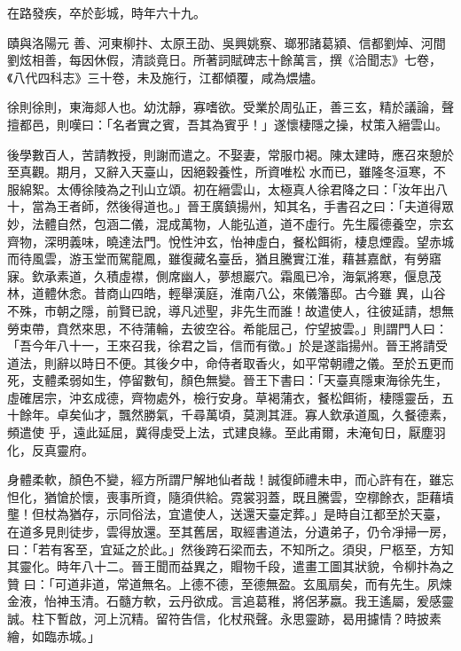 \begin{pinyinscope}
 在路發疾，卒於彭城，時年六十九。



 賾與洛陽元
 善、河東柳抃、太原王劭、吳興姚察、瑯邪諸葛潁、信都劉焯、河間劉炫相善，每因休假，清談竟日。所著詞賦碑志十餘萬言，撰《洽聞志》七卷，《八代四科志》三十卷，未及施行，江都傾覆，咸為煨燼。



 徐則徐則，東海郯人也。幼沈靜，寡嗜欲。受業於周弘正，善三玄，精於議論，聲擅都邑，則嘆曰：「名者實之賓，吾其為賓乎！」遂懷棲隱之操，杖策入縉雲山。



 後學數百人，苦請教授，則謝而遣之。不娶妻，常服巾褐。陳太建時，應召來憩於至真觀。期月，又辭入天臺山，因絕穀養性，所資唯松
 水而已，雖隆冬洹寒，不服綿絮。太傅徐陵為之刊山立頌。初在縉雲山，太極真人徐君降之曰：「汝年出八十，當為王者師，然後得道也。」晉王廣鎮揚州，知其名，手書召之曰：「夫道得眾妙，法體自然，包涵二儀，混成萬物，人能弘道，道不虛行。先生履德養空，宗玄齊物，深明義味，曉達法門。悅性沖玄，怡神虛白，餐松餌術，棲息煙霞。望赤城而待風雲，游玉堂而駕龍鳳，雖復藏名臺岳，猶且騰實江淮，藉甚嘉猷，有勞寤寐。欽承素道，久積虛襟，側席幽人，夢想巖穴。霜風已冷，海氣將寒，偃息茂林，道體休悆。昔商山四皓，輕舉漢庭，淮南八公，來儀籓邸。古今雖
 異，山谷不殊，市朝之隱，前賢已說，導凡述聖，非先生而誰！故遣使人，往彼延請，想無勞束帶，賁然來思，不待蒲輪，去彼空谷。希能屈己，佇望披雲。」則謂門人曰：「吾今年八十一，王來召我，徐君之旨，信而有徵。」於是遂詣揚州。晉王將請受道法，則辭以時日不便。其後夕中，命侍者取香火，如平常朝禮之儀。至於五更而死，支體柔弱如生，停留數旬，顏色無變。晉王下書曰：「天臺真隱東海徐先生，虛確居宗，沖玄成德，齊物處外，檢行安身。草褐蒲衣，餐松餌術，棲隱靈岳，五十餘年。卓矣仙才，飄然勝氣，千尋萬頃，莫測其涯。寡人欽承道風，久餐德素，頻遣使
 乎，遠此延屈，冀得虔受上法，式建良緣。至此甫爾，未淹旬日，厭塵羽化，反真靈府。



 身體柔軟，顏色不變，經方所謂尸解地仙者哉！誠復師禮未申，而心許有在，雖忘怛化，猶愴於懷，喪事所資，隨須供給。霓裳羽蓋，既且騰雲，空槨餘衣，詎藉墳壟！但杖為猶存，示同俗法，宜遣使人，送還天臺定葬。」是時自江都至於天臺，在道多見則徒步，雲得放還。至其舊居，取經書道法，分遺弟子，仍令凈掃一房，曰：「若有客至，宜延之於此。」然後跨石梁而去，不知所之。須臾，尸柩至，方知其靈化。時年八十二。晉王聞而益異之，賵物千段，遣畫工圖其狀貌，令柳抃為之贊
 曰：「可道非道，常道無名。上德不德，至德無盈。玄風扇矣，而有先生。夙煉金液，怡神玉清。石髓方軟，云丹欲成。言追葛稚，將侶茅嬴。我王遙屬，爰感靈誠。柱下暫啟，河上沉精。留符告信，化杖飛聲。永思靈跡，曷用攄情？時披素繪，如臨赤城。」




\end{pinyinscope}
